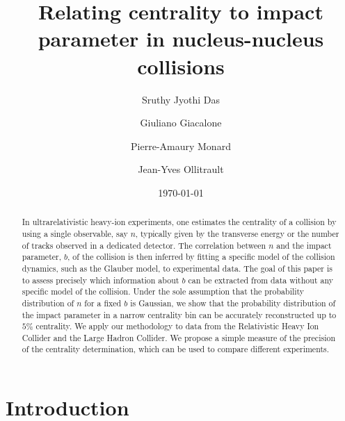 \documentclass[aps,prc,twocolumn,superscriptaddress,showpacs,floatfix,nofootinbib]{revtex4-1}
\begin{document}
\title{Relating centrality to impact parameter in nucleus-nucleus collisions}


\author{Sruthy Jyothi Das}
\author{Giuliano Giacalone}
\author{Pierre-Amaury Monard}
\author{Jean-Yves Ollitrault}
\date{\today}

\begin{abstract}
In ultrarelativistic heavy-ion experiments, one estimates the centrality of a collision by using a single observable, say $n$, typically given by the transverse energy or the number of tracks observed in a dedicated detector.
The correlation between $n$ and the impact parameter, $b$, of the collision is then inferred by fitting a specific model of the collision dynamics, such as the Glauber model, to experimental data. 
The goal of this paper is to assess precisely which information about $b$ can be extracted from data without any specific model of the collision. 
Under the sole assumption that the probability distribution of $n$ for a fixed $b$ is Gaussian, we show that the probability distribution of the impact parameter in a narrow centrality bin can be accurately reconstructed up to $5\%$ centrality.
We apply our methodology to data from the Relativistic Heavy Ion Collider and the Large Hadron Collider. 
We propose a simple measure of the precision of the centrality   determination, which can be used to compare different experiments.  
\end{abstract}

\maketitle

\section{Introduction}
\end{document}
